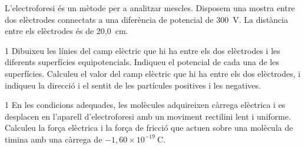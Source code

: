 L'electroforesi és un mètode per a analitzar mescles. Disposem una mostra entre dos elèctrodes connectats a una diferència de potencial de 300~V. La distància entre els elèctrodes és de 20,0~cm.


\begin{apartat}{1}
Dibuixeu les línies del camp elèctric que hi ha entre els dos elèctrodes i les diferents superfícies equipotencials. Indiqueu el potencial de cada una de les superfícies. Calculeu el valor del camp elèctric que hi ha entre els dos elèctrodes, i indiqueu la direcció i el sentit de les partícules positives i les negatives.
\end{apartat}

\begin{apartat}{1}
En les condicions adequades, les molècules adquireixen càrrega elèctrica i es desplacen en l'aparell d'electroforesi amb un moviment rectilini lent i uniforme. Calculeu la força elèctrica i la força de fricció que actuen sobre una molècula de timina amb una càrrega de $-1,60\times 10^{-19}\ \mathrm{C}$.
\end{apartat}
